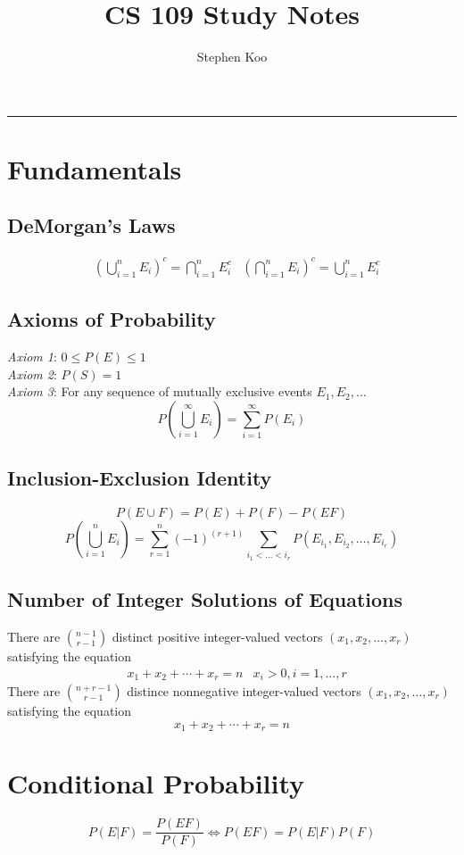 \documentclass[12pt]{article}
\title{CS 109 Study Notes}
\author{Stephen Koo}
\begin{document}
\maketitle
\vspace{-0.3in}
\rule{\linewidth}{0.4pt}

\section{Fundamentals}
\subsection{DeMorgan's Laws}
\begin{align*}
    &\left( \bigcup_{i=1}^n E_i \right)^c = \bigcap_{i=1}^n E_i^c &\left( \bigcap_{i=1}^n E_i \right)^c = \bigcup_{i=1}^n E_i^c
\end{align*}
\subsection{Axioms of Probability}
\emph{Axiom 1}: $0 \leq P(E) \leq 1$ \\
\emph{Axiom 2}: $P(S) = 1$ \\
\emph{Axiom 3}: For any sequence of mutually exclusive events $E_1, E_2, \ldots$
\[
    P\left( \bigcup_{i=1}^{\infty} E_i \right) = \sum_{i=1}^{\infty} P(E_i)
\]
\subsection{Inclusion-Exclusion Identity}
\[
    P(E \cup F) = P(E) + P(F) - P(EF)
\]
\[
    P\left( \bigcup_{i=1}^{n} E_i \right) = \sum_{r=1}^n (-1)^{(r+1)} \sum_{i_1 < \ldots < i_r} P(E_{i_1}, E_{i_2}, \ldots, E_{i_r})
\]
\subsection{Number of Integer Solutions of Equations}
There are $\binom{n-1}{r-1}$ distinct positive integer-valued vectors $(x_1, x_2, \ldots, x_r)$ satisfying the equation
\begin{align*}
    &x_1 + x_2 + \cdots + x_r = n &x_i > 0, i = 1, \ldots, r
\end{align*}
There are $\binom{n+r-1}{r-1}$ distince nonnegative integer-valued vectors $(x_1, x_2, \ldots, x_r)$ satisfying the equation
\[
    x_1 + x_2 + \cdots + x_r = n
\]

\section{Conditional Probability}
\[
    P(E|F) = \frac{P(EF)}{P(F)} \Leftrightarrow P(EF) = P(E|F)P(F)
\]
\end{document}
